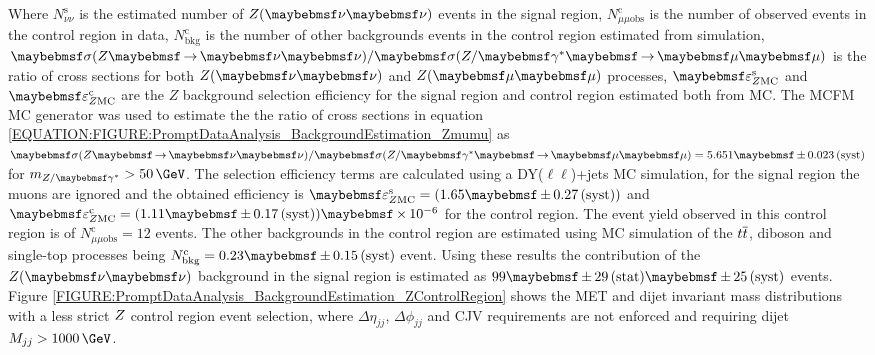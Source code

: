 
Where $N^\mathrm{s}_{\nu\nu}$ is the estimated number of $\Z(\nu \nu)$ events in the signal region, $N^\mathrm{c}_{\mu\mu\text{obs}}$ is the number of observed events in the control region in data, $N^\mathrm{c}_\text{bkg}$ is the number of other backgrounds events in the control region estimated from simulation, $\sigma(\Z \to \nu \nu) / \sigma(\Z/\gamma^{*} \to \mu \mu)$ is the ratio of cross sections for both $\Z(\nu \nu)$ and $\Z (\mu \mu)$ processes, $\varepsilon^\mathrm{s}_{\Z \mathrm{MC}}$ and  $\varepsilon^\mathrm{c}_{\Z \mathrm{MC}}$ are the $Z$ background selection efficiency for the signal region and control region estimated both from \gls{MC}. The \textsc{MCFM} \gls{MC} generator \cite{ARTICLE:MCFMGenerator} was used to estimate the the ratio of cross sections in equation \ref{EQUATION:FIGURE:PromptDataAnalysis_BackgroundEstimation_Zmumu} as $\sigma(\Z \to \nu \nu) / \sigma(\Z/\gamma^{*} \to \mu \mu) = 5.651 \pm 0.023\syst$ for $m_{\Z/\gamma^{*}} > 50\,\GeV$. The selection efficiency terms are calculated using a DY($\ell\ell$)+jets \gls{MC} simulation, for the signal region the muons are ignored and the obtained efficiency is $\varepsilon^\mathrm{s}_{\Z \mathrm{MC}} = (1.65 \pm 0.27\syst)$ and $\varepsilon^\mathrm{c}_{\Z \mathrm{MC}}=(1.11 \pm 0.17\syst) \times 10^{-6}$ for the control region. The event yield observed in this control region is of $N^\mathrm{c}_{\mu\mu\text{obs}} = 12$ events. The other backgrounds in the control region are estimated using \gls{MC} simulation of the $t\overline{t}$, diboson and single-top processes being $N^\mathrm{c}_\text{bkg}=0.23 \pm 0.15\syst$ event. Using  these results the contribution of the  $\Z (\nu \nu)$ background in the signal region is estimated as $99 \pm 29\stat \pm 25\syst$ events. Figure \ref{FIGURE:PromptDataAnalysis_BackgroundEstimation_ZControlRegion} shows the \gls{MET} and dijet invariant mass distributions with a less strict $Z$ control region event selection, where $\Delta\eta_{jj}$, $\Delta\phi_{jj}$ and \gls{CJV} requirements are not enforced and requiring dijet $M_{jj}>1000\,\GeV$. 

